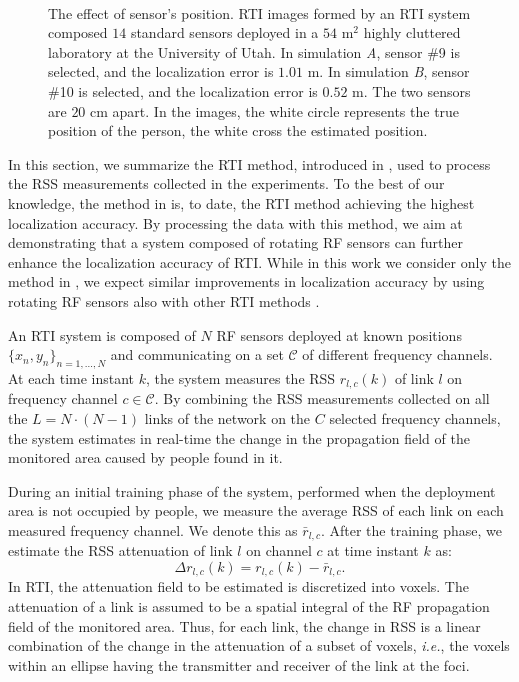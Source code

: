 \documentclass[conference]{IEEEtran}
\begin{document}
\begin{figure*}[t]
    \begin{center}
        \mbox{
             \quad
        }
        \caption{The effect of sensor's position. RTI images formed by an RTI system composed $14$ standard sensors deployed in a $54$ m$^2$ highly cluttered laboratory at the University of Utah. In simulation \emph{A}, sensor \#9 is selected, and the localization error is $1.01$ m. In simulation \emph{B}, sensor \#10 is selected, and the localization error is $0.52$ m. The two sensors are $20$ cm apart. In the images, the white circle represents the true position of the person, the white cross the estimated position.}
        \label{fig:RTI_comparison}
    \end{center}
\end{figure*}

In this section, we summarize the RTI method, introduced in \cite{multi_scale_arxiv}, used to process the RSS measurements collected in the experiments. To the best of our knowledge, the method in \cite{multi_scale_arxiv} is, to date, the RTI method achieving the highest localization accuracy. By processing the data with this method, we aim at demonstrating that a system composed of rotating RF sensors can further enhance the localization accuracy of RTI. While in this work we consider only the method in \cite{multi_scale_arxiv}, we expect similar improvements in localization accuracy by using rotating RF sensors also with other RTI methods \cite{Wilson_VRTI_2011,MASS_2012,Zhao_2013}.

An RTI system is composed of $N$ RF sensors deployed at known positions $\{x_n,y_n\}_{n=1,...,N}$ and communicating on a set $\mathcal{C}$ of different frequency channels. At each time instant $k$, the system measures the RSS $r_{l,c}(k)$ of link $l$ on frequency channel $c \in \mathcal{C}$. By combining the RSS measurements collected on all the $L = N \cdot (N-1)$ links of the network on the $C$ selected frequency channels, the system estimates in real-time the change in the propagation field of the monitored area caused by people found in it.

During an initial training phase of the system, performed when the deployment area is not occupied by people, we measure the average RSS of each link on each measured frequency channel. We denote this as $\bar{r}_{l,c}$. After the training phase, we estimate the RSS attenuation of link $l$ on channel $c$ at time instant $k$ as:
\begin{equation} \label{eq:link_attenuation}
    \Delta{r}_{l,c}(k) = r_{l,c}(k)-\bar{r}_{l,c}.
\end{equation}
In RTI, the attenuation field to be estimated is discretized into voxels. The attenuation of a link is assumed to be a spatial integral of the RF propagation field of the monitored area. Thus, for each link, the change in RSS is a linear combination of the change in the attenuation of a subset of voxels, \emph{i.e.}, the voxels within an ellipse having the transmitter and receiver of the link at the foci.
\end{document}
